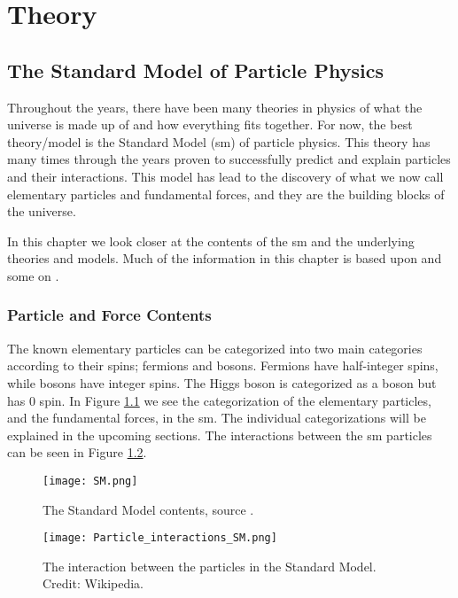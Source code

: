 \documentclass[a4paper, american, 12pt]{report}
\begin{document}
	\part{Theory}
	\label{part:Theory}
	
	\chapter{The Standard Model of Particle Physics}
	\label{chap:Theory-SM}
	Throughout the years, there have been many theories in physics of what the universe is made up of and how everything fits together. For now, the best theory/model is the Standard Model (\acrshort{sm}) of particle physics. This theory has many times through the years proven to successfully predict and explain particles and their interactions. This model has lead to the discovery of what we now call elementary particles and fundamental forces, and they are the building blocks of the universe.
	
	In this chapter we look closer at the contents of the \acrshort{sm} and the underlying theories and models. Much of the information in this chapter is based upon \citet{thomson2013modern} and some on \citet{PhysicsHypertextbook}.
	
	
	\section{Particle and Force Contents}
	\label{sect:Theory-Particles}
	The known elementary particles can be categorized into two main categories according to their spins; fermions and bosons. Fermions have half-integer spins, while bosons have integer spins. The Higgs boson is categorized as a boson but has 0 spin. In Figure \ref{fig:SM} we see the categorization of the elementary particles, and the fundamental forces, in the \acrshort{sm}. The individual categorizations will be explained in the upcoming sections. The interactions between the \acrshort{sm} particles can be seen in Figure \ref{fig:interactions_SM}.
	
	\begin{figure}[ht!]
		\vspace{-1.0cm}
		\hspace*{-2.2cm}
		\centering\texttt{[image: SM.png]}
		\caption[The Standard Model.]{The Standard Model contents, source \cite{SM}.\label{fig:SM}}
	\end{figure} 

	\begin{figure}[htb!]
		\centering\texttt{[image: Particle\_interactions\_SM.png]}
		\caption[Particle interactions in the SM.]{The interaction between the particles in the Standard Model. Credit: Wikipedia.\label{fig:interactions_SM}}
	\end{figure} 
\end{document}
